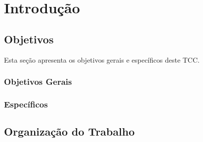 \chapter{Introdução}
\label{cap-introducao}


\section{Objetivos}

Esta seção apresenta os objetivos gerais e específicos deste TCC.

\subsection{Objetivos Gerais}


\subsection{Específicos}



\section{Organização do Trabalho}
